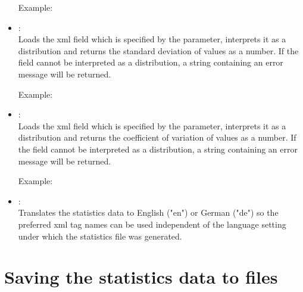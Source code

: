 \begin{itemize}
Example:\\

\item
{}:\\
Loads the xml field which is specified by the parameter, interprets it as a distribution and
returns the standard deviation of values as a  number.
If the field cannot be interpreted as a distribution, a string containing an error message will be returned.

Example:

\item
{}:\\
Loads the xml field which is specified by the parameter, interprets it as a distribution and
returns the coefficient of variation of values as a  number.
If the field cannot be interpreted as a distribution, a string containing an error message will be returned.

Example:\\

\item
{}:\\
Translates the statistics data to English ("{}en") or German ("{}de") so the preferred xml tag names can be
used independent of the language setting under which the statistics file was generated.

\end{itemize}

\section{Saving the statistics data to files}


